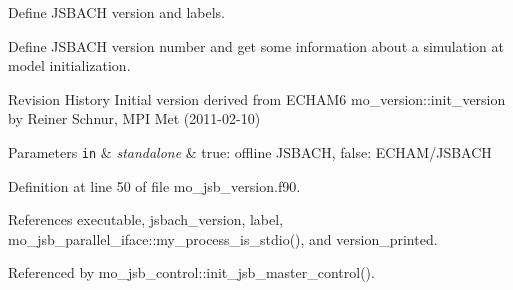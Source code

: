 Define J\+S\+B\+A\+C\+H version and labels. 

Define J\+S\+B\+A\+C\+H version number and get some information about a simulation at model initialization.

\begin{DoxyParagraph}{Revision History}
Initial version derived from E\+C\+H\+A\+M6 mo\+\_\+version\+::init\+\_\+version by Reiner Schnur, M\+P\+I Met (2011-\/02-\/10)
\end{DoxyParagraph}

\begin{DoxyParams}[1]{Parameters}
\mbox{\tt in}  & {\em standalone} & true\+: offline J\+S\+B\+A\+C\+H, false\+: E\+C\+H\+A\+M/\+J\+S\+B\+A\+C\+H \\
\hline
\end{DoxyParams}


Definition at line 50 of file mo\+\_\+jsb\+\_\+version.\+f90.



References executable, jsbach\+\_\+version, label, mo\+\_\+jsb\+\_\+parallel\+\_\+iface\+::my\+\_\+process\+\_\+is\+\_\+stdio(), and version\+\_\+printed.



Referenced by mo\+\_\+jsb\+\_\+control\+::init\+\_\+jsb\+\_\+master\+\_\+control().


